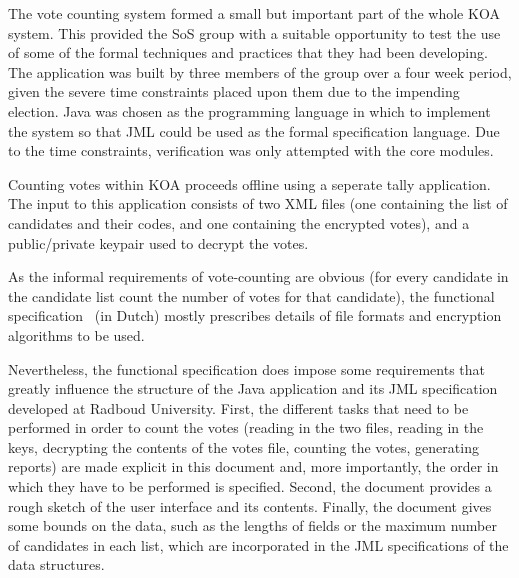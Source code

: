\documentclass[times, 10pt, twocolumn]{article}
\begin{document}
The vote counting system formed a small but important part of the whole KOA 
system. This provided the SoS group with a suitable opportunity to test the use 
of some of the formal techniques and practices that they had been developing. 
The application was built by three members of the group over a four week 
period, given the severe time constraints placed upon them due to the impending 
election. Java was chosen as the programming language in which to implement the 
system so that JML could be used as the formal specification language. Due to the time 
constraints, verification was only attempted with the core modules.

Counting votes within KOA proceeds offline using a seperate tally application. 
The input to this application consists of two XML files (one containing the 
list of candidates and their codes, and one containing the encrypted votes), 
and a public/private keypair used to decrypt the votes.

As the informal requirements of vote-counting are obvious (for every candidate 
in the candidate list count the number of votes for that candidate), the 
functional specification~\cite{KOAspec} (in Dutch) mostly prescribes details of 
file formats and encryption algorithms to be used.

Nevertheless, the functional specification does impose some requirements that 
greatly influence the structure of the Java application and its JML 
specification developed at Radboud University. First, the different tasks that 
need to be performed in order to count the votes (reading in the two files, 
reading in the keys, decrypting the contents of the votes file, counting the 
votes, generating reports) are made explicit in this document and, more 
importantly, the order in which they have to be performed is specified. Second, 
the document provides a rough sketch of the user interface and its contents. 
Finally, the document gives some bounds on the data, such as the lengths of 
fields or the maximum number of candidates in each list, which are incorporated 
in the JML specifications of the data structures.

\end{document}
